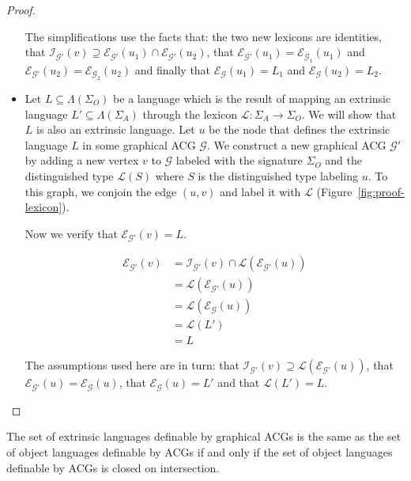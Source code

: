\begin{proof}
\begin{itemize}
      The simplifications use the facts that: the two new lexicons are
      identities, that $\mathcal{I}_{\mathcal{G}'}(v) \supseteq
      \mathcal{E}_{\mathcal{G}'}(u_1) \cap
      \mathcal{E}_{\mathcal{G}'}(u_2)$, that
      $\mathcal{E}_{\mathcal{G}'}(u_1) =
      \mathcal{E}_{\mathcal{G}_1}(u_1)$ and
      $\mathcal{E}_{\mathcal{G}'}(u_2) =
      \mathcal{E}_{\mathcal{G}_2}(u_2)$ and finally that
      $\mathcal{E}_{\mathcal{G}}(u_1) = L_1$ and
      $\mathcal{E}_{\mathcal{G}}(u_2) = L_2$.

  \item Let $L \subseteq \Lambda(\Sigma_O)$ be a language which is the
    result of mapping an extrinsic language $L' \subseteq
    \Lambda(\Sigma_A)$ through the lexicon $\mathcal{L} : \Sigma_A \to
    \Sigma_O$. We will show that $L$ is also an extrinsic language. Let
    $u$ be the node that defines the extrinsic language $L$ in some
    graphical ACG $\mathcal{G}$. We construct a new graphical ACG
    $\mathcal{G}'$ by adding a new vertex $v$ to $\mathcal{G}$ labeled
    with the signature $\Sigma_O$ and the distinguished type
    $\mathcal{L}(S)$ where $S$ is the distinguished type labeling
    $u$. To this graph, we conjoin the edge $(u,v)$ and label it with
    $\mathcal{L}$ (Figure~\ref{fig:proof-lexicon}).

    Now we verify that $\mathcal{E}_{\mathcal{G}'}(v) = L$.

    \begin{align*}
      \mathcal{E}_{\mathcal{G}'}(v) &= \mathcal{I}_{\mathcal{G}'}(v) \cap
      \mathcal{L}(\mathcal{E}_{\mathcal{G}'}(u)) \\
      &= \mathcal{L}(\mathcal{E}_{\mathcal{G}'}(u)) \\
      &= \mathcal{L}(\mathcal{E}_{\mathcal{G}}(u)) \\
      &= \mathcal{L}(L') \\
      &= L
    \end{align*}

    The assumptions used here are in turn: that
    $\mathcal{I}_{\mathcal{G}'}(v) \supseteq
    \mathcal{L}(\mathcal{E}_{\mathcal{G}'}(u))$, that
    $\mathcal{E}_{\mathcal{G}'}(u) = \mathcal{E}_{\mathcal{G}}(u)$, that
    $\mathcal{E}_{\mathcal{G}}(u) = L'$ and that $\mathcal{L}(L') = L$.
  \end{itemize}
\end{proof}

\begin{corollary}
  The set of extrinsic languages definable by graphical ACGs is the same
  as the set of object languages definable by ACGs if and only if the
  set of object languages definable by ACGs is closed on intersection.
\end{corollary}

